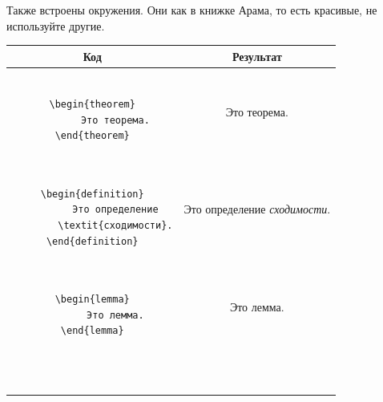 Также встроены окружения. Они как в книжке Арама, то есть красивые, не используйте другие.
\begin{center}
\begin{tabular}{|c|c|}
\hline
        Код & Результат

\\ \hline        
        \begin{minipage}{3in}
                \begin{verbatim}

\begin{theorem}
        Это теорема.
\end{theorem}
                \end{verbatim}
        \end{minipage}
        & 
        \begin{minipage}{3in}
                \begin{theorem}
                        Это теорема.
                \end{theorem}
        \end{minipage}
\\ \hline
        \begin{minipage}{3in}
                \begin{verbatim}

\begin{definition}
        Это определение
        \textit{сходимости}.
\end{definition}
                \end{verbatim}
        \end{minipage}
        & 
        \begin{minipage}{3in}
                \begin{definition}
                        Это определение \textit{сходимости}.
                \end{definition}
        \end{minipage}
\\ \hline
        \begin{minipage}{3in}
                \begin{verbatim}

\begin{lemma}
        Это лемма.
\end{lemma}
                \end{verbatim}
        \end{minipage}
        & 
        \begin{minipage}{3in}
                \begin{lemma}
                        Это лемма.
                \end{lemma}
        \end{minipage}
\\ \hline
        \begin{minipage}{3in}
                \begin{verbatim}


\end{verbatim}
\end{minipage}
\end{tabular}
\end{center}
